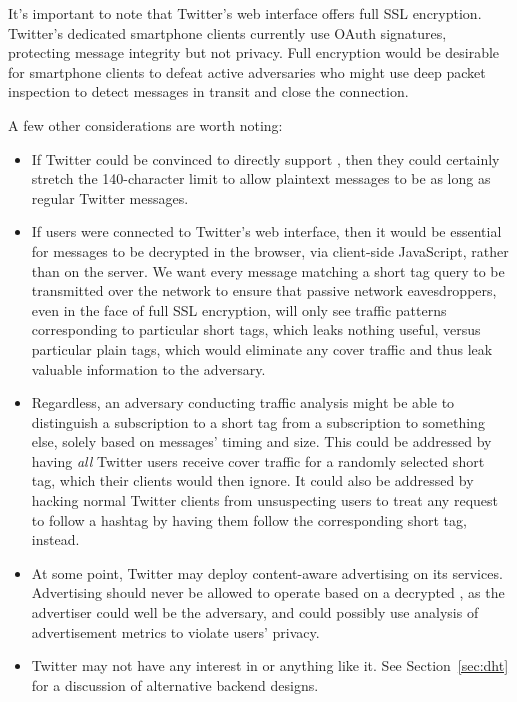 It's important to note that Twitter's web interface offers full SSL encryption. Twitter's dedicated smartphone clients currently use OAuth signatures, protecting message integrity but not privacy. Full encryption would be desirable for smartphone clients to defeat active adversaries who might use deep packet inspection to detect \hoot messages in transit and close the connection.

A few other considerations are worth noting:
\begin{itemize}
\item If Twitter could be convinced to directly support \hoot, then they could certainly stretch the 140-character limit to allow \hoot plaintext messages to be as long as regular Twitter messages.

\item If \hoot users were connected to Twitter's web interface, then it would be essential for \hoot messages to be decrypted in the browser, via client-side JavaScript, rather than on the server. We want every \hoot message matching a short tag query to be transmitted over the network to ensure that passive network eavesdroppers, even in the face of full SSL encryption, will only see traffic patterns corresponding to particular short tags, which leaks nothing useful, versus particular plain tags, which would eliminate any cover traffic and thus leak valuable information to the adversary.

\item Regardless, an adversary conducting traffic analysis might be able to distinguish a subscription to a \hoot short tag from a subscription to something else, solely based on messages' timing and size. This could be addressed by having {\em all} Twitter users receive \hoot cover traffic for a randomly selected \hoot short tag, which their clients would then ignore. It could also be addressed by hacking normal Twitter clients from unsuspecting users to treat any request to follow a hashtag by having them follow the corresponding \hoot short tag, instead.

\item At some point, Twitter may deploy content-aware advertising on its services. Advertising should never be allowed to operate based on a decrypted \hoot, as the advertiser could well be the adversary, and could possibly use analysis of advertisement metrics to violate \hoot users' privacy.

\item Twitter may not have any interest in \hoot or anything like it. See Section~\ref{sec:dht} for a discussion of alternative backend designs.

\end{itemize}



